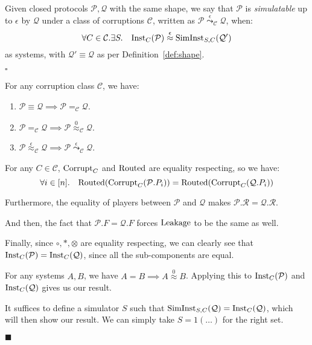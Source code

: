 \begin{definition}[Simulatability]
  Given closed protocols $\mathcal{P}, \mathcal{Q}$ with the same shape,
  we say that $\mathcal{P}$ is \emph{simulatable} up to $\epsilon$ by $\mathcal{Q}$
  under a class of corruptions $\mathcal{C}$,
  written as $\mathcal{P} \overset{\epsilon}{\leadsto}_{\mathcal{C}} \mathcal{Q}$,
  when:
  $$
  \forall C \in \mathcal{C}.\exists S.\quad \text{Inst}_C(\mathcal{P}) \overset{\epsilon}{\approx} \text{SimInst}_{S, C}(\mathcal{Q}')
  $$
  as systems, with $\mathcal{Q}' \equiv \mathcal{Q}$ as per 
  Definition~\ref{def:shape}.

  $\square$
\end{definition}

\begin{theorem}
For any corruption class $\mathcal{C}$, we have:
\begin{enumerate}
\item $\mathcal{P} \equiv \mathcal{Q} \implies \mathcal{P} =_\mathcal{C} \mathcal{Q}$.
\item $\mathcal{P} =_{\mathcal{C}} \mathcal{Q} \implies \mathcal{P} \overset{0}{\approx}_\mathcal{C} \mathcal{Q}$.
\item $\mathcal{P} \overset{\epsilon}{\approx}_{\mathcal{C}} \mathcal{Q} \implies \mathcal{P} \overset{\epsilon}{\leadsto}_\mathcal{C} \mathcal{Q}$.
\end{enumerate}


For any $C \in \mathcal{C}$, $\text{Corrupt}_{C}$ and $\text{Routed}$ are equality respecting,
so we have:
$$
\forall i \in [n].\quad \text{Routed}(\text{Corrupt}_C(\mathcal{P}.P_i)) = 
\text{Routed}(\text{Corrupt}_C(\mathcal{Q}.P_i))
$$

Furthermore, the equality of players between $\mathcal{P}$ and $\mathcal{Q}$
makes $\mathcal{P}.\mathcal{R} = \mathcal{Q}.\mathcal{R}$.

And then, the fact that $\mathcal{P}.F = \mathcal{Q}.F$ forces $\text{Leakage}$
to be the same as well.

Finally, since $\circ, *, \otimes$ are equality respecting, we
can clearly see that $\text{Inst}_C(\mathcal{P}) = \text{Inst}_C(\mathcal{Q})$,
since all the sub-components are equal.

 For any systems $A, B$, we have $A = B \implies A \overset{0}{\approx} B$.
Applying this to $\text{Inst}_C(\mathcal{P})$ and $\text{Inst}_C(\mathcal{Q})$
gives us our result.

 It suffices to define a simulator $S$ such that
$\text{SimInst}_{S, C}(\mathcal{Q}) = \text{Inst}_C(\mathcal{Q})$,
which will then show our result.
We can simply take $S = 1(\ldots)$ for the right set.

$\blacksquare$
\end{theorem}

